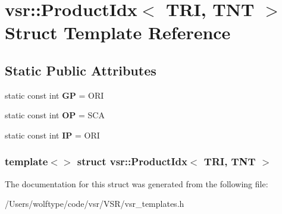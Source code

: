 \hypertarget{structvsr_1_1_product_idx_3_01_t_r_i_00_01_t_n_t_01_4}{\section{vsr\-:\-:Product\-Idx$<$ T\-R\-I, T\-N\-T $>$ Struct Template Reference}
\label{structvsr_1_1_product_idx_3_01_t_r_i_00_01_t_n_t_01_4}
}
\subsection*{Static Public Attributes}
\begin{DoxyCompactItemize}
\item 
\hypertarget{structvsr_1_1_product_idx_3_01_t_r_i_00_01_t_n_t_01_4_aeb02bcf9f7bee54954dc53e940b10f1d}{static const int {\bfseries G\-P} = O\-R\-I}\label{structvsr_1_1_product_idx_3_01_t_r_i_00_01_t_n_t_01_4_aeb02bcf9f7bee54954dc53e940b10f1d}

\item 
\hypertarget{structvsr_1_1_product_idx_3_01_t_r_i_00_01_t_n_t_01_4_a7c593f652a4d9399a6b2f67aef2b9401}{static const int {\bfseries O\-P} = S\-C\-A}\label{structvsr_1_1_product_idx_3_01_t_r_i_00_01_t_n_t_01_4_a7c593f652a4d9399a6b2f67aef2b9401}

\item 
\hypertarget{structvsr_1_1_product_idx_3_01_t_r_i_00_01_t_n_t_01_4_af945ec64a11463a5fffa72fb174fcb88}{static const int {\bfseries I\-P} = O\-R\-I}\label{structvsr_1_1_product_idx_3_01_t_r_i_00_01_t_n_t_01_4_af945ec64a11463a5fffa72fb174fcb88}

\end{DoxyCompactItemize}
\subsubsection*{template$<$$>$ struct vsr\-::\-Product\-Idx$<$ T\-R\-I, T\-N\-T $>$}



The documentation for this struct was generated from the following file\-:\begin{DoxyCompactItemize}
\item 
/\-Users/wolftype/code/vsr/\-V\-S\-R/vsr\-\_\-templates.\-h\end{DoxyCompactItemize}
